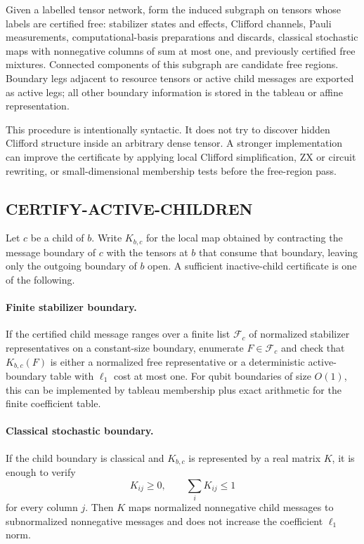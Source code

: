 Given a labelled tensor network, form the induced subgraph on tensors whose labels are certified free: stabilizer states and effects, Clifford channels, Pauli measurements, computational-basis preparations and discards, classical stochastic maps with nonnegative columns of sum at most one, and previously certified free mixtures. Connected components of this subgraph are candidate free regions. Boundary legs adjacent to resource tensors or active child messages are exported as active legs; all other boundary information is stored in the tableau or affine representation.

This procedure is intentionally syntactic. It does not try to discover hidden Clifford structure inside an arbitrary dense tensor. A stronger implementation can improve the certificate by applying local Clifford simplification, ZX or circuit rewriting, or small-dimensional membership tests before the free-region pass.

\subsection{CERTIFY-ACTIVE-CHILDREN}

Let \(c\) be a child of \(b\). Write \(K_{b,c}\) for the local map obtained by contracting the message boundary of \(c\) with the tensors at \(b\) that consume that boundary, leaving only the outgoing boundary of \(b\) open. A sufficient inactive-child certificate is one of the following.

\paragraph{Finite stabilizer boundary.}
If the certified child message ranges over a finite list \(\mathcal F_c\) of normalized stabilizer representatives on a constant-size boundary, enumerate \(F\in\mathcal F_c\) and check that \(K_{b,c}(F)\) is either a normalized free representative or a deterministic active-boundary table with \(\ell_1\) cost at most one. For qubit boundaries of size \(O(1)\), this can be implemented by tableau membership plus exact arithmetic for the finite coefficient table.

\paragraph{Classical stochastic boundary.}
If the child boundary is classical and \(K_{b,c}\) is represented by a real matrix \(K\), it is enough to verify
\[
K_{ij}\ge 0,\qquad \sum_i K_{ij}\le 1
\]
for every column \(j\). Then \(K\) maps normalized nonnegative child messages to subnormalized nonnegative messages and does not increase the coefficient \(\ell_1\) norm.

